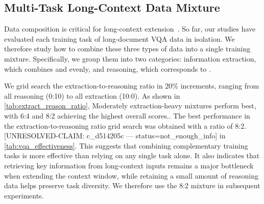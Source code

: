 \subsection{Multi-Task Long-Context Data Mixture}
\label{sec:mixing:ratio}
Data composition is critical for long-context extension~\citep{fu2024data,gao2025prolong}.
So far, our studies have evaluated each training task of long-document VQA data in isolation.
We therefore study how to combine these three types of data into a single training mixture.
Specifically, we group them into two categories: information extraction, which combines \extractsingle and \extractmulti evenly, and reasoning, which corresponds to \reasoningtask.

We grid search the extraction-to-reasoning ratio in 20\% increments, ranging from all reasoning (0:10) to all extraction (10:0).
As shown in \cref{tab:extract_reason_ratio}, Moderately extraction-heavy mixtures perform best, with 6:4 and 8:2 achieving the highest overall scores..
The best performance in the extraction-to-reasoning ratio grid search was obtained with a ratio of 8:2. [UNRESOLVED-CLAIM: c_d514205c — status=not_enough_info] in \cref{tab:vqa_effectiveness}.
This suggests that combining complementary training tasks is more effective than relying on any single task alone.
It also indicates that retrieving key information from long-context inputs remains a major bottleneck when extending the context window, while retaining a small amount of reasoning data helps preserve task diversity.
We therefore use the 8:2 mixture in subsequent experiments.

